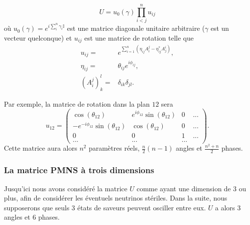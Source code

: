             \begin{equation}\label{eq::compact_pmns}
                U=u_0(\gamma)\prod_{i<j}^n u_{ij}
            \end{equation}
            où $u_0(\gamma)=e^{i \sum_{i}^{n}\gamma_i \mathbb{I}}$ est une matrice diagonale unitaire arbitraire ($\gamma$ est un vecteur quelconque) et $u_{ij}$ est une matrice de rotation telle que
            \begin{equation}
                \begin{split}
                    u_{ij}= & e^{\sum_{i=1}^n\left(\eta_{ij}A_i^j-\eta_{ij}^*A_j^i\right)},\\
                    \eta_{ij} = & \theta_{ij}e^{i\phi_{ij}},\\
                    \left(A_i^j\right)_k^l = & \delta_{ik}\delta_{jl}.
                \end{split}
            \end{equation}
            
            Par exemple, la matrice de rotation dans la plan $12$ sera
            \begin{equation}
                u_{12} = 
                \left(\begin{matrix}
                    \cos(\theta_{12}) & e^{i\phi_{12}}\sin(\theta_{12}) & 0 & ... \\
                    -e^{-i\phi_{12}}\sin(\theta_{12}) & \cos(\theta_{12}) & 0 & ... \\
                    0 & 0 & 1 & ... \\
                    ... & ... & ... &
                \end{matrix}\right).
            \end{equation}
            Cette matrice aura alors $n^2$ paramètres réels, $\frac{n}{2}(n-1)$ angles  et $\frac{n^2+n}{2}$ phases.
            
            \subsubsection{La matrice PMNS à trois dimensions}
            Jusqu'ici nous avons considéré la matrice $U$ comme ayant une dimension de 3 ou plus, afin de considérer les éventuels neutrinos stériles. Dans la suite, nous supposerons que seuls 3 états de saveurs peuvent osciller entre eux. $U$ a alors 3 angles et 6 phases.
            
